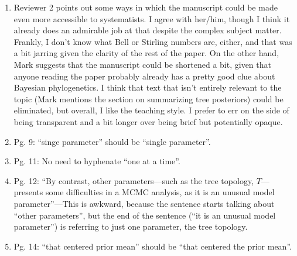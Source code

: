 \documentclass[10pt]{article}
\newcommand{\brmadd}[1]{{\color{blue}{#1}}}
\begin{document}
\begin{flushleft}
\begin{enumerate}
\medskip
\item{Reviewer 2 points out some ways in which the manuscript could be made even more accessible to systematists. I agree with her/him, though I think it already does an admirable job at that despite the complex subject matter. Frankly, I don't know what Bell or Stirling numbers are, either, and that was a bit jarring given the clarity of the rest of the paper. On the other hand, Mark suggests that the manuscript could be shortened a bit, given that anyone reading the paper probably already has a pretty good clue about Bayesian phylogenetics. I think that text that isn't entirely relevant to the topic (Mark mentions the section on summarizing tree posteriors) could be eliminated, but overall, I like the teaching style. I prefer to err on the side of being transparent and a bit longer over being brief but potentially opaque.}\\
\brmadd{We agree: sacrificing extreme brevity for the sake of clarity is a good trade off. We have followed suggestions to improve the clarity of our presentation, while eliminating anything that is not directly relevant to understanding the method.}

\medskip
\item{Pg. 9: ``singe parameter'' should be ``single parameter''.}\\
\brmadd{Done.} 

\medskip
\item{Pg. 11: No need to hyphenate ``one at a time''.}\\
\brmadd{Done.} 

\medskip
\item{Pg. 12: ``By contrast, other parameters---such as the tree topology, $T$---presents some difficulties in a MCMC analysis, as it is an unusual model parameter''---This is awkward, because the sentence starts talking about ``other parameters'', but the end of the sentence (``it is an unusual model parameter'') is referring to just one parameter, the tree topology.}\\
\brmadd{We agree that this was awkwardly written. We have attempted to improve the clarity using the following revised text: ``By contrast, it is far more difficult to summarize complex, discrete parameters.
For instance, there is no natural way to summarize an MCMC sample of tree topologies, except perhaps to simply report the posterior probabilities of individual trees.''}

\medskip
\item{Pg. 14: ``that centered prior mean'' should be ``that centered the prior mean''.}\\
\brmadd{Done.} 


\end{enumerate}
\end{flushleft}
\end{document}
